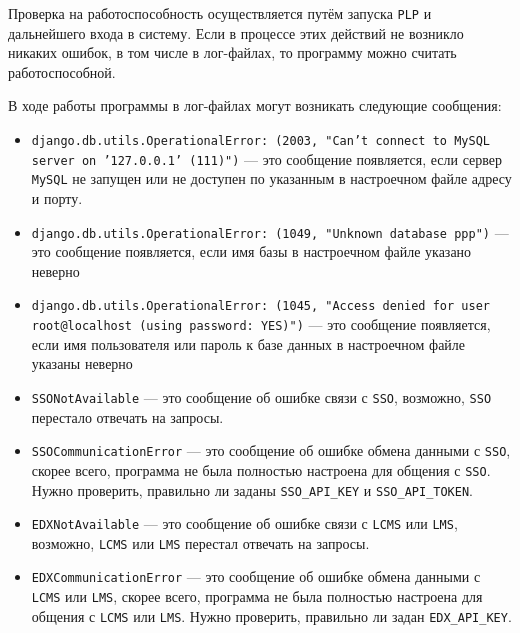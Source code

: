 Проверка на работоспособность осуществляется путём запуска \texttt{PLP} и дальнейшего входа
в систему. Если в процессе этих действий не возникло никаких ошибок, в том числе в лог-файлах,
то программу можно считать работоспособной.

В ходе работы программы в лог-файлах могут возникать следующие сообщения:
\begin{itemize}
	\item \texttt{django.db.utils.OperationalError: (2003, "Can't connect to MySQL server on '127.0.0.1' (111)")} ---
		это сообщение появляется, если сервер \texttt{MySQL} не запущен или не доступен по указанным в настроечном файле адресу и порту.
	\item \texttt{django.db.utils.OperationalError: (1049, "Unknown database \textquotesingle{}ppp\textquotesingle{}")} --- это сообщение
		появляется, если имя базы в настроечном файле указано неверно
	\item \texttt{django.db.utils.OperationalError: (1045, "Access denied for user \textquotesingle{}root\textquotesingle{}@\textquotesingle{}localhost\textquotesingle{} (using password: YES)")} ---
		это сообщение появляется, если имя пользователя или пароль к базе данных в настроечном файле указаны неверно
	\item \texttt{SSONotAvailable} --- это сообщение об ошибке связи с \texttt{SSO}, возможно,
		\texttt{SSO} перестало отвечать на запросы.
	\item \texttt{SSOCommunicationError} --- это сообщение об ошибке обмена данными с \texttt{SSO},
		скорее всего, программа не была полностью настроена для общения с \texttt{SSO}.
		Нужно проверить, правильно ли заданы \texttt{SSO\_API\_KEY} и \texttt{SSO\_API\_TOKEN}.
	\item \texttt{EDXNotAvailable} --- это сообщение об ошибке связи с \texttt{LCMS} или \texttt{LMS},
		возможно, \texttt{LCMS} или \texttt{LMS} перестал отвечать на запросы.
	\item \texttt{EDXCommunicationError} --- это сообщение об ошибке обмена данными
		с \texttt{LCMS} или \texttt{LMS}, скорее всего,
		программа не была полностью настроена для общения с \texttt{LCMS} или \texttt{LMS}.
		Нужно проверить, правильно ли задан \texttt{EDX\_API\_KEY}.
\end{itemize}